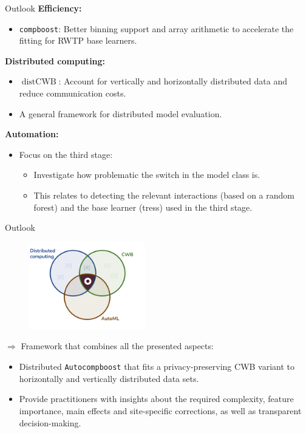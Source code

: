 \documentclass[t,10pt]{beamer}
\begin{document}
\begin{frame}{Outlook}
    \textbf{Efficiency:}
    \begin{itemize}
        \item 
            \texttt{compboost}: Better binning support and array arithmetic to accelerate the fitting for RWTP base learners.
    \end{itemize}
    \textbf{Distributed computing:}
    \begin{itemize}
        \item 
            $\operatorname{distCWB}$: Account for vertically and horizontally distributed data and reduce communication costs.
        \item
            A general framework for distributed model evaluation. 
    \end{itemize}
    \textbf{Automation:}
    \begin{itemize}
        \item 
            Focus on the third stage: 
            \begin{itemize}
                \item Investigate how problematic the switch in the model class is.
                \item This relates to detecting the relevant interactions (based on a random forest) and the base learner (tress) used in the third stage. 
            \end{itemize}
    \end{itemize}
\end{frame}

\begin{frame}{Outlook}
  \begin{figure}
    \centering
    \includegraphics[width=0.45\textwidth]{figures/topics-outlook.png}
  \end{figure}
  $\Rightarrow$ Framework that combines all the presented aspects:
    \begin{itemize}
      \item Distributed \texttt{Autocompboost} that fits a privacy-preserving CWB variant to horizontally and vertically distributed data sets.\vspace{0.1cm}
      \item Provide practitioners with insights about the required complexity, feature importance, main effects and site-specific corrections, as well as transparent decision-making.
    \end{itemize}
\end{frame}
\end{document}
